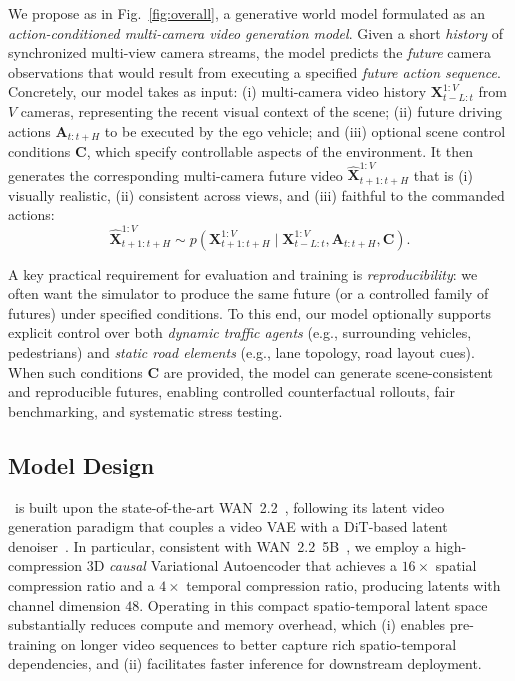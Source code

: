 We propose \textbf{\modelname} as in Fig.~\ref{fig:overall}, a generative world model formulated as an \emph{action-conditioned multi-camera video generation model}. Given a short \emph{history} of synchronized multi-view camera streams, the model predicts the \emph{future} camera observations that would result from executing a specified \emph{future action sequence}. 
%
Concretely, our model takes as input:
(i) multi-camera video history $\mathbf{X}_{t-L:t}^{1:V}$ from $V$ cameras, representing the recent visual context of the scene;
(ii) future driving actions $\mathbf{A}_{t:t+H}$ to be executed by the ego vehicle;
and (iii) optional scene control conditions $\mathbf{C}$, which specify controllable aspects of the environment.
It then generates the corresponding multi-camera future video $\hat{\mathbf{X}}_{t+1:t+H}^{1:V}$ that is (i) visually realistic, (ii) consistent across views, and (iii) faithful to the commanded actions:
\begin{equation}
\hat{\mathbf{X}}_{t+1:t+H}^{1:V} \sim
p\!\left(\mathbf{X}_{t+1:t+H}^{1:V}\mid \mathbf{X}_{t-L:t}^{1:V}, \mathbf{A}_{t:t+H}, \mathbf{C}\right).
\label{eq:world_model}
\end{equation}

A key practical requirement for evaluation and training is \emph{reproducibility}: we often want the simulator to produce the same future (or a controlled family of futures) under specified conditions. To this end, our model optionally supports explicit control over both \emph{dynamic traffic agents} (e.g., surrounding vehicles, pedestrians) and \emph{static road elements} (e.g., lane topology, road layout cues). When such conditions $\mathbf{C}$ are provided, the model can generate scene-consistent and reproducible futures, enabling controlled counterfactual rollouts, fair benchmarking, and systematic stress testing.


\subsection{Model Design}\label{subet_bm}
\modelname~is built upon the state-of-the-art WAN~2.2~\cite{wan2025wanopenadvancedlargescale}, following its latent video generation paradigm that couples a video VAE with a DiT-based latent denoiser~\cite{peebles2023scalable}.
%
In particular, consistent with WAN~2.2~5B~\cite{wan2025wanopenadvancedlargescale}, we employ a high-compression 3D \emph{causal} Variational Autoencoder that achieves a $16\times$ spatial compression ratio and a $4\times$ temporal compression ratio, producing latents with channel dimension $48$.
%
Operating in this compact spatio-temporal latent space substantially reduces compute and memory overhead, which (i) enables pre-training on longer video sequences to better capture rich spatio-temporal dependencies, and (ii) facilitates faster inference for downstream deployment.\newline

